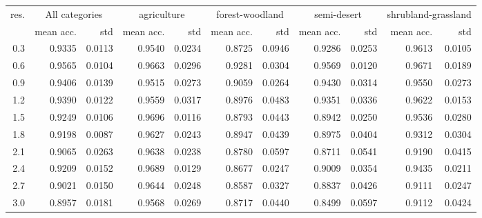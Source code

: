 \begin{tabular}{rrrrrrrrrrr}
\toprule
res. & \multicolumn{2}{c}{All categories} & \multicolumn{2}{c}{agriculture} & \multicolumn{2}{c}{forest-woodland} & \multicolumn{2}{c}{semi-desert} & \multicolumn{2}{c}{shrubland-grassland} \\
           &     mean acc. &    std &                 mean acc. &    std &                     mean acc. &    std &                 mean acc. &    std &                         mean acc. &    std \\
\midrule
       0.3 &   0.9335 & 0.0113 &               0.9540 & 0.0234 &                   0.8725 & 0.0946 &               0.9286 & 0.0253 &                       0.9613 & 0.0105 \\
       0.6 &   0.9565 & 0.0104 &               0.9663 & 0.0296 &                   0.9281 & 0.0304 &               0.9569 & 0.0120 &                       0.9671 & 0.0189 \\
       0.9 &   0.9406 & 0.0139 &               0.9515 & 0.0273 &                   0.9059 & 0.0264 &               0.9430 & 0.0314 &                       0.9550 & 0.0273 \\
       1.2 &   0.9390 & 0.0122 &               0.9559 & 0.0317 &                   0.8976 & 0.0483 &               0.9351 & 0.0336 &                       0.9622 & 0.0153 \\
       1.5 &   0.9249 & 0.0106 &               0.9696 & 0.0116 &                   0.8793 & 0.0443 &               0.8942 & 0.0250 &                       0.9536 & 0.0280 \\
       1.8 &   0.9198 & 0.0087 &               0.9627 & 0.0243 &                   0.8947 & 0.0439 &               0.8975 & 0.0404 &                       0.9312 & 0.0304 \\
       2.1 &   0.9065 & 0.0263 &               0.9638 & 0.0238 &                   0.8780 & 0.0597 &               0.8711 & 0.0541 &                       0.9190 & 0.0415 \\
       2.4 &   0.9209 & 0.0152 &               0.9689 & 0.0129 &                   0.8677 & 0.0247 &               0.9009 & 0.0354 &                       0.9435 & 0.0211 \\
       2.7 &   0.9021 & 0.0150 &               0.9644 & 0.0248 &                   0.8587 & 0.0327 &               0.8837 & 0.0426 &                       0.9111 & 0.0247 \\
       3.0 &   0.8957 & 0.0181 &               0.9568 & 0.0269 &                   0.8717 & 0.0440 &               0.8499 & 0.0597 &                       0.9112 & 0.0424 \\

\end{tabular}
